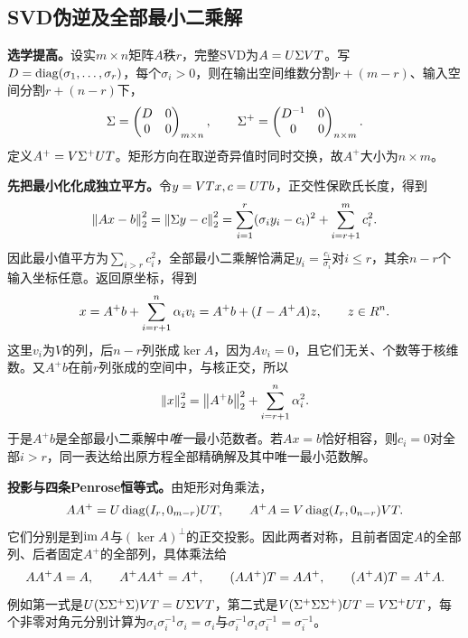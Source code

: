 \subsection{SVD伪逆及全部最小二乘解}\label{der:general-pseudoinverse}
\textbf{选学提高。}设实$m\times n$矩阵$A$秩$r$，完整SVD为$A=U\Sigma VT$。写$D=\operatorname{diag}(\sigma_1,\ldots,\sigma_r)$，每个$\sigma_i>0$，则在输出空间维数分割$r+(m-r)$、输入空间分割$r+(n-r)$下，
\[
\Sigma=\begin{pmatrix}D&0\\0&0\end{pmatrix}_{m\times n},\qquad
\Sigma^+=\begin{pmatrix}D^{-1}&0\\0&0\end{pmatrix}_{n\times m}.
\]
定义$A^+=V\Sigma^+UT$。矩形方向在取逆奇异值时同时交换，故$A^+$大小为$n\times m$。

\textbf{先把最小化化成独立平方。}令$y=VT x,c=UT b$，正交性保欧氏长度，得到
\[
\left\lVert Ax-b\right\rVert_2^2=\left\lVert\Sigma y-c\right\rVert_2^2
=\sum_{i=1}^r(\sigma_i y_i-c_i)^2+\sum_{i=r+1}^m c_i^2.
\]
因此最小值平方为$\sum_{i>r}c_i^2$，全部最小二乘解恰满足$y_i=\frac{c_i}{\sigma_i}$对$i\le r$，其余$n-r$个输入坐标任意。返回原坐标，得到
\[
x=A^+b+\sum_{i=r+1}^n\alpha_i v_i
=A^+b+(I-A^+A)z,\qquad z\in R^n.
\]
这里$v_i$为$V$的列，后$n-r$列张成$\ker A$，因为$Av_i=0$，且它们无关、个数等于核维数。又$A^+b$在前$r$列张成的空间中，与核正交，所以
\[
\left\lVert x\right\rVert_2^2=\left\lVert A^+b\right\rVert_2^2+\sum_{i=r+1}^n\alpha_i^2.
\]
于是$A^+b$是全部最小二乘解中\emph{唯一}最小范数者。若$Ax=b$恰好相容，则$c_i=0$对全部$i>r$，同一表达给出原方程全部精确解及其中唯一最小范数解。

\textbf{投影与四条Penrose恒等式。}由矩形对角乘法，
\[
AA^+=U\operatorname{diag}(I_r,0_{m-r})UT,\qquad
A^+A=V\operatorname{diag}(I_r,0_{n-r})VT.
\]
它们分别是到$\operatorname{im} A$与$(\ker A)^\perp$的正交投影。因此两者对称，且前者固定$A$的全部列、后者固定$A^+$的全部列，具体乘法给
\[
AA^+A=A,\qquad A^+AA^+=A^+,\qquad
(AA^+)T=AA^+,\qquad(A^+A)T=A^+A.
\]
例如第一式是$U(\Sigma\Sigma^+\Sigma)VT=U\Sigma VT$，第二式是$V(\Sigma^+\Sigma\Sigma^+)UT=V\Sigma^+UT$，每个非零对角元分别计算为$\sigma_i\sigma_i^{-1}\sigma_i=\sigma_i$与$\sigma_i^{-1}\sigma_i\sigma_i^{-1}=\sigma_i^{-1}$。

